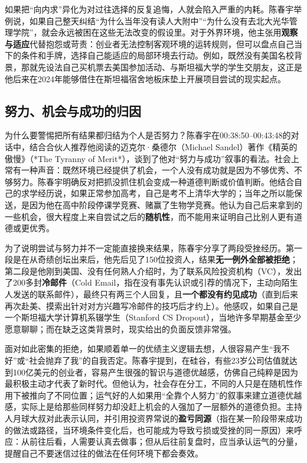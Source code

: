 \documentclass[UTF8,a4paper,11pt,fontset=fandol]{ctexart}
\begin{document}
如果把“向内求”异化为对过往选择的反复追悔，人就会陷入严重的内耗。陈春宇举例说，如果自己整天纠结“为什么当年没有读人大附中”“为什么没有去北大光华管理学院”，就会永远被困在这些无法改变的假设里。对于外界环境，他主张用\textbf{观察与适应}代替抱怨或苛责：创业者无法控制客观环境的运转规则，但可以盘点自己当下的条件和手牌，选择自己能适应的局部环境去行动。例如，既然没有美国名校背景，那就先设法自己买机票去美国参加活动、与斯坦福大学的学生交朋友，这正是他后来在2024年能够借住在斯坦福宿舍地板床垫上开展项目尝试的现实起点。

\subsection{努力、机会与成功的归因}
为什么要警惕把所有结果都归结为个人是否努力？陈春宇在00:38:50–00:43:48的对话中，结合合伙人推荐他阅读的迈克尔·桑德尔（Michael Sandel）著作《精英的傲慢》（*The Tyranny of Merit*），谈到了他对“努力与成功”叙事的看法。社会上常有一种声音：既然环境已经提供了机会，一个人没有成功就是因为不够优秀、不够努力。陈春宇明确反对把抓没抓住机会变成一种道德判断或价值判断。他结合自己的求学经历说，如果正常参加高考，自己是考不上清华大学的；当年之所以能保送，是因为他在高中阶段停课学竞赛、赌赢了生物学竞赛。他认为自己后来拿到的一些机会，很大程度上来自尝试之后的\textbf{随机性}，而不能用来证明自己比别人更有道德或更优秀。

为了说明尝试与努力并不一定能直接换来结果，陈春宇分享了两段受挫经历。第一段是在从奇绩创坛出来后，他先后见了150位投资人，结果\textbf{无一例外全部被拒绝}；第二段是他刚到美国、没有任何熟人介绍时，为了联系风险投资机构（VC），发出了200多封\textbf{冷邮件}（Cold Email，指在没有事先认识或引荐的情况下，主动向陌生人发送的联系邮件），最终只有两三个人回复，且\textbf{一个都没有约见成功}（直到后来再次赴美、摸索出针对对方兴趣写冷邮件的技巧后才约上）。他感叹，如果自己是一个斯坦福大学计算机系辍学生（Stanford CS Dropout），当地许多早期基金至少愿意聊聊；而在缺乏这类背景时，现实给出的负面反馈非常强。

面对如此密集的拒绝，如果顺着单一的优绩主义逻辑去想，人很容易产生“我不好”或“社会抛弃了我”的自我否定。陈春宇提到，在硅谷，有些23岁公司估值就达到100亿美元的创业者，容易产生很强的智识与道德优越感，仿佛自己纯粹是因为最积极主动才代表了新时代。但他认为，社会存在分工，不同的人只是在随机性作用下被推向了不同位置；运气好的人如果用“全靠个人努力”的叙事来建立道德优越感，实际上是给那些同样努力却没赶上机会的人强加了一层额外的道德负担。主持人月球大叔对此表示认同，并引用投资界常说的\textbf{盈亏同源}（指在某一阶段带来成功的做法或路径，当环境条件变化后，也可能成为导致亏损或受挫的同一原因）来呼应：从前往后看，人需要认真去做事；但从后往前复盘时，应当承认运气的分量，提醒自己不要迷信过往的做法在任何环境下都会奏效。
\end{document}
